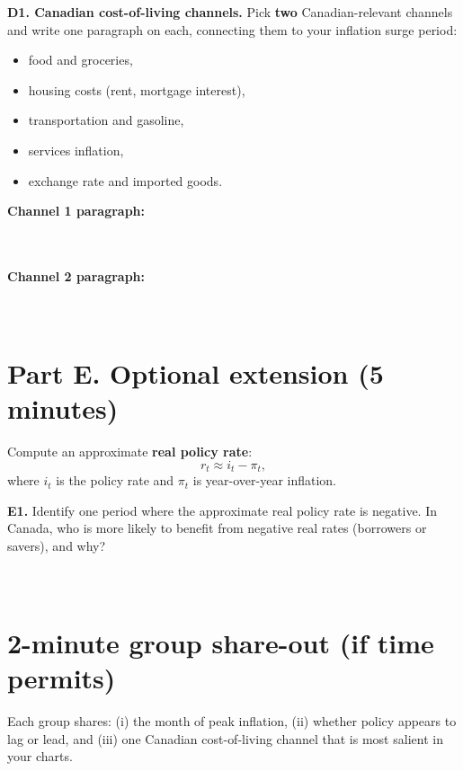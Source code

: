 \documentclass[11pt]{article}
\begin{document}
\vspace{0.5em}
\textbf{D1. Canadian cost-of-living channels.} Pick \textbf{two} Canadian-relevant channels and write one paragraph on each, connecting them to your inflation surge period:
\begin{itemize}
\item food and groceries,
\item housing costs (rent, mortgage interest),
\item transportation and gasoline,
\item services inflation,
\item exchange rate and imported goods.
\end{itemize}

\vspace{0.5em}
\textbf{Channel 1 paragraph:}\\[0.75em]
\underline{\hspace{0.9\linewidth}}\\[0.75em]
\underline{\hspace{0.9\linewidth}}\\[0.75em]
\underline{\hspace{0.9\linewidth}}

\vspace{0.5em}
\textbf{Channel 2 paragraph:}\\[0.75em]
\underline{\hspace{0.9\linewidth}}\\[0.75em]
\underline{\hspace{0.9\linewidth}}\\[0.75em]
\underline{\hspace{0.9\linewidth}}

\section*{Part E. Optional extension (5 minutes)}
Compute an approximate \textbf{real policy rate}:
\[
r_t \approx i_t - \pi_t,
\]
where $i_t$ is the policy rate and $\pi_t$ is year-over-year inflation.

\vspace{0.5em}
\textbf{E1.} Identify one period where the approximate real policy rate is negative. In Canada, who is more likely to benefit from negative real rates (borrowers or savers), and why?\\[0.75em]
\underline{\hspace{0.9\linewidth}}\\[0.75em]
\underline{\hspace{0.9\linewidth}}\\[0.75em]
\underline{\hspace{0.9\linewidth}}

\section*{2-minute group share-out (if time permits)}
Each group shares: (i) the month of peak inflation, (ii) whether policy appears to lag or lead, and (iii) one Canadian cost-of-living channel that is most salient in your charts.
\end{document}
